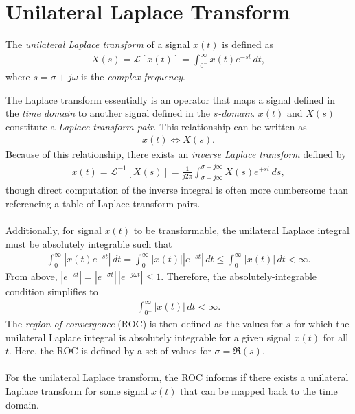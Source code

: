 \documentclass{report}
\begin{document}
\section{Unilateral Laplace Transform}
\begin{tcolorbox}[width=\textwidth,colback={white}, sharp corners]
    The \emph{unilateral Laplace transform} of a signal $x(t)$ is defined as  
    \begin{align}
        X(s) = \mathcal{L}[x(t)] = \int_{0^-}^{\infty} x(t) e^{-st} \,dt,
    \end{align}
    where $s=\sigma + j\omega$ is the \emph{complex frequency}. 
\end{tcolorbox}
\noindent The Laplace transform essentially is an operator that maps a signal defined in the \emph{time domain} to another signal 
defined in the \emph{$s$-domain}. $x(t)$ and $X(s)$ constitute a \emph{Laplace transform pair}. This relationship can be written as 
\begin{align}
    x(t) \iff X(s).
\end{align}
Because of this relationship, there exists an \emph{inverse Laplace transform} defined by 
\begin{align}
    x(t) = \mathcal{L}^{-1}[X(s)] = \frac{1}{j2\pi}\int_{\sigma-j\infty}^{\sigma+j\infty} X(s) e^{+st} \,ds,
\end{align}
though direct computation of the inverse integral is often more cumbersome than referencing a table of Laplace transform pairs.
\\ \\
Additionally, for signal $x(t)$ to be transformable, the unilateral Laplace integral must be absolutely integrable such that 
\begin{align}
    \int_{0^-}^{\infty} |x(t) e^{-st}| \,dt = \int_{0^-}^{\infty} |x(t)| |e^{-st}| \,dt \leq \int_{0^-}^{\infty} |x(t)| \,dt < \infty. 
\end{align}
From above, $|e^{-st}|=|e^{-\sigma t}|\,|e^{-j\omega t}|\leq 1$. Therefore, the absolutely-integrable condition simplifies to 
\begin{align}
    \int_{0^-}^{\infty} |x(t)| \,dt < \infty.
\end{align}
The \emph{region of convergence} (ROC) is then defined as the values for $s$ for which the unilateral Laplace integral is absolutely integrable 
for a given signal $x(t)$ for all $t$. Here, the ROC is defined by a set of values for $\sigma = \Re(s)$.
\\ \\
For the unilateral Laplace transform, the ROC informs if there exists a unilateral Laplace transform for some signal $x(t)$ that can be mapped back to the time domain. 
\end{document}

